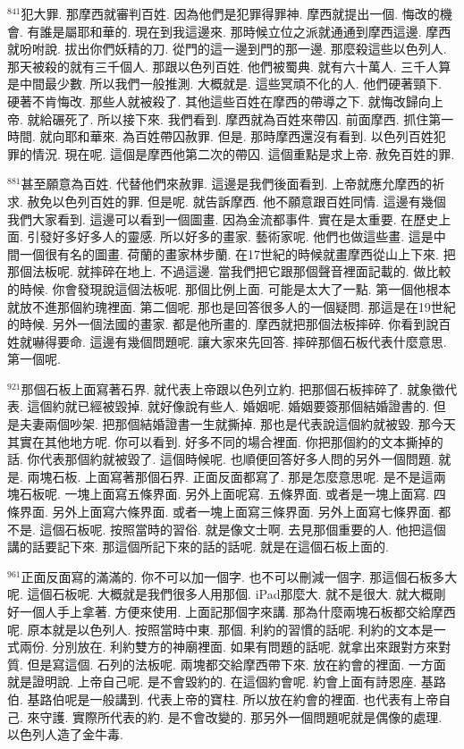 \documentclass{book}
\begin{document}
$^{841}$犯大罪.
那摩西就審判百姓.
因為他們是犯罪得罪神.
摩西就提出一個.
悔改的機會.
有誰是屬耶和華的.
現在到我這邊來.
那時候立位之派就通通到摩西這邊.
摩西就吩咐說.
拔出你們妖精的刀.
從門的這一邊到門的那一邊.
那麼殺這些以色列人.
那天被殺的就有三千個人.
那跟以色列百姓.
他們被蜀典.
就有六十萬人.
三千人算是中間最少數.
所以我們一般推測.
大概就是.
這些冥頑不化的人.
他們硬著頸下.
硬著不肯悔改.
那些人就被殺了.
其他這些百姓在摩西的帶導之下.
就悔改歸向上帝.
就給碾死了.
所以接下來.
我們看到.
摩西就為百姓來帶囚.
前面摩西.
抓住第一時間.
就向耶和華來.
為百姓帶囚赦罪.
但是.
那時摩西還沒有看到.
以色列百姓犯罪的情況.
現在呢.
這個是摩西他第二次的帶囚.
這個重點是求上帝.
赦免百姓的罪.

$^{881}$甚至願意為百姓.
代替他們來赦罪.
這邊是我們後面看到.
上帝就應允摩西的祈求.
赦免以色列百姓的罪.
但是呢.
就告訴摩西.
他不願意跟百姓同情.
這邊有幾個我們大家看到.
這邊可以看到一個圖畫.
因為金流都事件.
實在是太重要.
在歷史上面.
引發好多好多人的靈感.
所以好多的畫家.
藝術家呢.
他們也做這些畫.
這是中間一個很有名的圖畫.
荷蘭的畫家林步蘭.
在17世紀的時候就畫摩西從山上下來.
把那個法板呢.
就摔碎在地上.
不過這邊.
當我們把它跟那個聲音裡面記載的.
做比較的時候.
你會發現說這個法板呢.
那個比例上面.
可能是太大了一點.
第一個他根本就放不進那個約瑰裡面.
第二個呢.
那也是回答很多人的一個疑問.
那這是在19世紀的時候.
另外一個法國的畫家.
都是他所畫的.
摩西就把那個法板摔碎.
你看到說百姓就嚇得要命.
這邊有幾個問題呢.
讓大家來先回答.
摔碎那個石板代表什麼意思.
第一個呢.

$^{921}$那個石板上面寫著石界.
就代表上帝跟以色列立約.
把那個石板摔碎了.
就象徵代表.
這個約就已經被毀掉.
就好像說有些人.
婚姻呢.
婚姻要簽那個結婚證書的.
但是夫妻兩個吵架.
把那個結婚證書一生就撕掉.
那也是代表說這個約就被毀.
那今天其實在其他地方呢.
你可以看到.
好多不同的場合裡面.
你把那個約的文本撕掉的話.
你代表那個約就被毀了.
這個時候呢.
也順便回答好多人問的另外一個問題.
就是.
兩塊石板.
上面寫著那個石界.
正面反面都寫了.
那是怎麼意思呢.
是不是這兩塊石板呢.
一塊上面寫五條界面.
另外上面呢寫.
五條界面.
或者是一塊上面寫.
四條界面.
另外上面寫六條界面.
或者一塊上面寫三條界面.
另外上面寫七條界面.
都不是.
這個石板呢.
按照當時的習俗.
就是像文士啊.
去見那個重要的人.
他把這個講的話要記下來.
那這個所記下來的話的話呢.
就是在這個石板上面的.

$^{961}$正面反面寫的滿滿的.
你不可以加一個字.
也不可以刪減一個字.
那這個石板多大呢.
這個石板呢.
大概就是我們很多人用那個.
iPad那麼大.
就不是很大.
就大概剛好一個人手上拿著.
方便來使用.
上面記那個字來講.
那為什麼兩塊石板都交給摩西呢.
原本就是以色列人.
按照當時中東.
那個.
利約的習慣的話呢.
利約的文本是一式兩份.
分別放在.
利約雙方的神廟裡面.
如果有問題的話呢.
就拿出來跟對方來對質.
但是寫這個.
石列的法板呢.
兩塊都交給摩西帶下來.
放在約會的裡面.
一方面就是證明說.
上帝自己呢.
是不會毀約的.
在這個約會呢.
約會上面有詩恩座.
基路伯.
基路伯呢是一般講到.
代表上帝的寶柱.
所以放在約會的裡面.
也代表有上帝自己.
來守護.
實際所代表的約.
是不會改變的.
那另外一個問題呢就是偶像的處理.
以色列人造了金牛毒.
\end{document}
